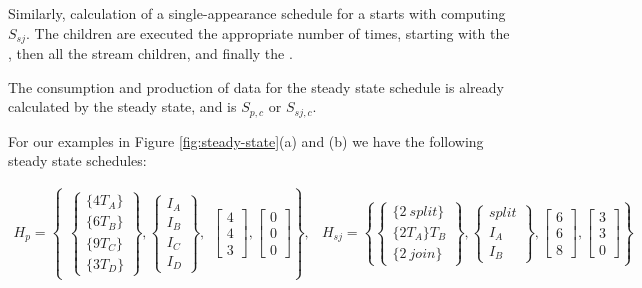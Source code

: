 Similarly, calculation of a single-appearance schedule for a
{\splitjoin} starts with computing $S_{sj}$. The children are
executed the appropriate number of times, starting with the
{\splitter}, then all the stream children, and finally the {\joiner}.

The consumption and production of data for the steady state
schedule is already calculated by the steady state, and is
$S_{p,c}$ or $S_{sj,c}$.

For our examples in Figure \ref{fig:steady-state}(a) and (b) we
have the following steady state schedules:

\begin{displaymath}
\begin{array}{lr}
H_p = \left\{\begin{array}{l}\left\{\begin{array}{c}\{4T_A\}\\
\{6T_B\} \\ \{9T_C\}\\ \{3T_D\}\end{array}\right\}, \left\{\begin{array}{c}I_A\\
I_B\\ I_C\\ I_D\end{array}\right\},\end{array} \left[
\begin{array}{c}
4\\4\\3
\end{array}\right], \left[
\begin{array}{c}
0\\0\\0
\end{array}\right] \right\}, &
H_{sj} = \left\{\left\{\begin{array}{c}\{2\ split\}\\ \{2T_A\} T_B
\\ \{2\ join\}\end{array}\right\}, \left\{\begin{array}{c}split\\I_A\\I_B\end{array}\right\},
\left[
\begin{array}{c}
6\\6\\8
\end{array}\right], \left[
\begin{array}{c}
3\\3\\0
\end{array}\right] \right\}
\end{array}
\end{displaymath}


